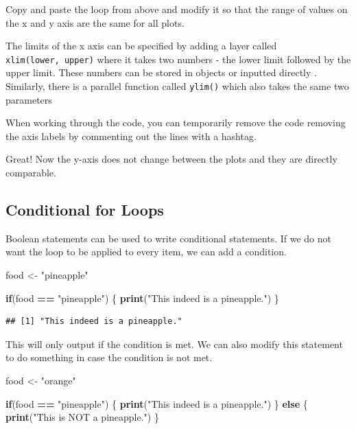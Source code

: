 \documentclass[
]{book}
\newenvironment{Shaded}{\begin{snugshade}}{\end{snugshade}}
\newcommand{\ControlFlowTok}[1]{\textcolor[rgb]{0.13,0.29,0.53}{\textbf{#1}}}
\newcommand{\FunctionTok}[1]{\textcolor[rgb]{0.13,0.29,0.53}{\textbf{#1}}}
\newcommand{\NormalTok}[1]{#1}
\newcommand{\OtherTok}[1]{\textcolor[rgb]{0.56,0.35,0.01}{#1}}
\newcommand{\SpecialCharTok}[1]{\textcolor[rgb]{0.81,0.36,0.00}{\textbf{#1}}}
\newcommand{\StringTok}[1]{\textcolor[rgb]{0.31,0.60,0.02}{#1}}
\begin{document}
Copy and paste the loop from above and modify it so that the range of values on the x and y axis are the same for all plots.

The limits of the x axis can be specified by adding a layer called \texttt{xlim(lower,\ upper)} where it takes two numbers - the lower limit followed by the upper limit. These numbers can be stored in objects or inputted directly . Similarly, there is a parallel function called \texttt{ylim()} which also takes the same two parameters

When working through the code, you can temporarily remove the code removing the axis labels by commenting out the lines with a hashtag.

Great! Now the y-axis does not change between the plots and they are directly comparable.

\subsection{Conditional for Loops}\label{conditional-for-loops}

Boolean statements can be used to write conditional statements. If we do not want the loop to be applied to every item, we can add a condition.

\begin{Shaded}
\begin{Highlighting}[]
\NormalTok{food }\OtherTok{\textless{}{-}} \StringTok{"pineapple"}

\ControlFlowTok{if}\NormalTok{(food }\SpecialCharTok{==} \StringTok{"pineapple"}\NormalTok{) \{}
  \FunctionTok{print}\NormalTok{(}\StringTok{"This indeed is a pineapple."}\NormalTok{)}
\NormalTok{\}}
\end{Highlighting}
\end{Shaded}

\begin{verbatim}
## [1] "This indeed is a pineapple."
\end{verbatim}

This will only output if the condition is met. We can also modify this statement to do something in case the condition is not met.

\begin{Shaded}
\begin{Highlighting}[]
\NormalTok{food }\OtherTok{\textless{}{-}} \StringTok{"orange"}

\ControlFlowTok{if}\NormalTok{(food }\SpecialCharTok{==} \StringTok{"pineapple"}\NormalTok{) \{}
  \FunctionTok{print}\NormalTok{(}\StringTok{"This indeed is a pineapple."}\NormalTok{)}
\NormalTok{\} }\ControlFlowTok{else}\NormalTok{ \{}
  \FunctionTok{print}\NormalTok{(}\StringTok{"This is NOT a pineapple."}\NormalTok{)}
\NormalTok{\}}
\end{Highlighting}
\end{Shaded}
\end{document}
